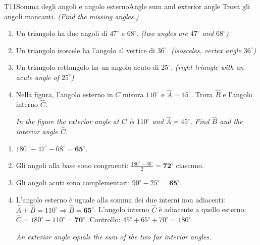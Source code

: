 \documentclass[11pt,a4paper]{article}
\newcommand{\en}[1]{\par{\small\itshape\color{engray}#1\par}}
\newcommand{\enx}[1]{{\small\itshape\color{engray}(#1)}}
\newcommand{\av}[1]{\widehat{#1}}
\begin{document}
\begin{esercizio}{T1}{1}{Somma degli angoli e angolo esterno}{Angle sum and exterior angle}
Trova gli angoli mancanti. \enx{Find the missing angles.}
\begin{enumerate}
\item Un triangolo ha due angoli di $47^\circ$ e $68^\circ$. \enx{two angles are $47^\circ$ and $68^\circ$}
\item Un triangolo isoscele ha l'angolo al vertice di $36^\circ$. \enx{isosceles, vertex angle $36^\circ$}
\item Un triangolo rettangolo ha un angolo acuto di $25^\circ$. \enx{right triangle with an acute angle of $25^\circ$}
\item Nella figura, l'angolo esterno in $C$ misura $110^\circ$ e $\av A=45^\circ$. Trova $\av B$ e l'angolo interno $\av C$.
\en{In the figure the exterior angle at $C$ is $110^\circ$ and $\hat A = 45^\circ$. Find $\hat B$ and the interior angle $\hat C$.}
\end{enumerate}
\begin{center}
\end{center}
\end{esercizio}
\begin{solbox}
\begin{enumerate}
\item $180^\circ-47^\circ-68^\circ=\mathbf{65^\circ}$.
\item Gli angoli alla base sono congruenti: $\frac{180^\circ-36^\circ}{2}=\mathbf{72^\circ}$ ciascuno.
\item Gli angoli acuti sono complementari: $90^\circ-25^\circ=\mathbf{65^\circ}$.
\item L'angolo esterno è uguale alla somma dei due interni non adiacenti: $\av A+\av B=110^\circ\Rightarrow\av B=\mathbf{65^\circ}$. L'angolo interno $\av C$ è adiacente a quello esterno: $\av C=180^\circ-110^\circ=\mathbf{70^\circ}$. Controllo: $45^\circ+65^\circ+70^\circ=180^\circ$ \checkmark
\en{An exterior angle equals the sum of the two far interior angles.}
\end{enumerate}
\end{solbox}
\end{document}
